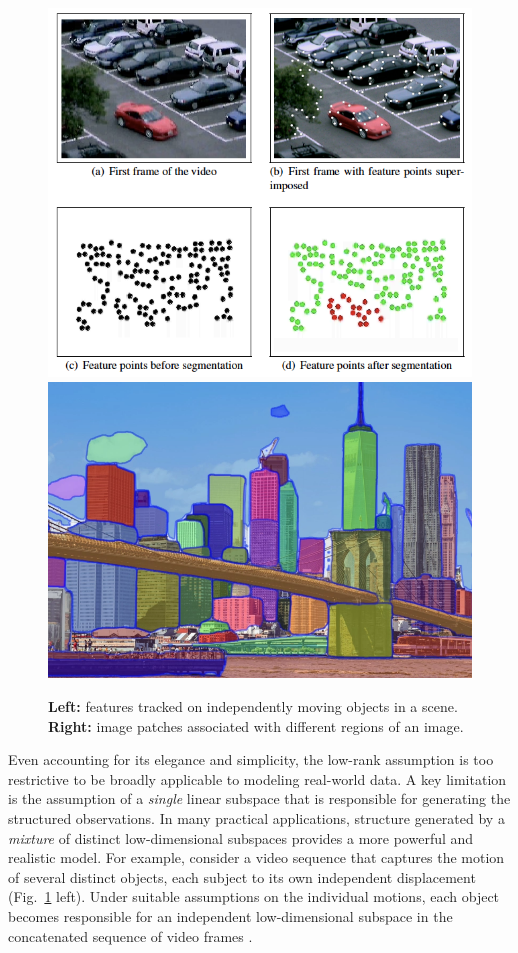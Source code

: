 \documentclass[../../book-main.tex]{subfiles}
\begin{document}
\begin{figure}
    \centering
    \includegraphics[height=0.35\linewidth]{figs_chap2/motion.png} \hspace{5mm}
    \includegraphics[height=0.349\linewidth]{figs_chap2/segment.png} 
    \caption{\textbf{Left:} features tracked on independently moving objects in a scene. \textbf{Right:} image patches associated with different regions of an image.}
    \label{fig:multiple-subspaces}
\end{figure}
Even accounting for its elegance and simplicity, the low-rank assumption is too restrictive to be broadly applicable to modeling real-world data. 
A key limitation is the assumption of a \textit{single} linear subspace that is responsible for generating the structured observations.
In many practical applications, structure generated by a \textit{mixture} of distinct low-dimensional subspaces provides a more
powerful and realistic model.
For example, consider a video sequence that captures the motion of several distinct objects, each subject to its own independent displacement (Fig.\ \ref{fig:multiple-subspaces} left). 
Under suitable assumptions on the individual motions, each object becomes responsible for an independent low-dimensional subspace in the concatenated sequence of video frames \cite{VidalR2004-ECCV}.
\end{document}
